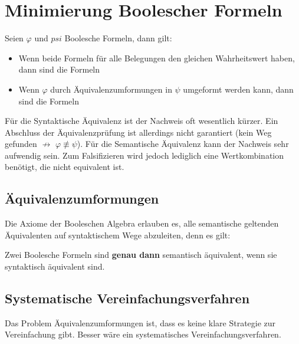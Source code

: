 \documentclass[12pt]{report}
\begin{document}
\section{Minimierung Boolescher Formeln}
\begin{defbox}
  Seien $\varphi$ und $psi$ Boolesche Formeln, dann gilt:
  
  \begin{itemize}
    \item Wenn beide Formeln für alle Belegungen den gleichen Wahrheitswert haben, dann sind die Formeln
          
          
          
    \item Wenn $\varphi$ durch Äquivalenzumformungen in $\psi$ umgeformt werden kann, dann sind die Formeln
          
  \end{itemize}
\end{defbox}

Für die Syntaktische Äquivalenz ist der Nachweis oft wesentlich kürzer. Ein Abschluss der Äquivalenzprüfung ist allerdings nicht garantiert (kein Weg gefunden $\not \rightarrow$ $\varphi \not \equiv \psi$).
Für die Semantische Äquivalenz kann der Nachweis sehr aufwendig sein. Zum Falsifizieren wird jedoch lediglich eine Wertkombination benötigt, die nicht equivalent ist.

\subsection{Äquivalenzumformungen}
Die Axiome der Booleschen Algebra erlauben es, alle semantische geltenden Äquivalenten auf syntaktischem Wege abzuleiten, denn es gilt:

\begin{center}
  Zwei Boolesche Formeln sind \textbf{genau dann} semantisch äquivalent, wenn sie syntaktisch äquivalent sind.
\end{center}


\subsection{Systematische Vereinfachungsverfahren}
Das Problem Äquivalenzumformungen ist, dass es keine klare Strategie zur Vereinfachung gibt.
Besser wäre ein systematisches Vereinfachungsverfahren.
\end{document}
